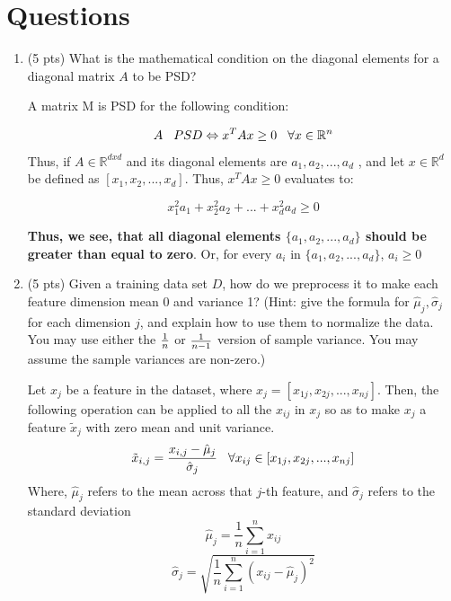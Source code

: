 \documentclass[a4paper]{article}
\theoremstyle{definition}
\newenvironment{soln}{
    \leavevmode\color{blue}\ignorespaces
}{}
\begin{document}
\section{Questions}
\begin{enumerate}

\item (5 pts) What is the mathematical condition on the diagonal elements for a diagonal matrix $A$ to be PSD?

\begin{soln}

A matrix M is PSD for the following condition:

$$
A \hspace{0.3cm} PSD \Leftrightarrow  x^TAx \geq 0 \hspace{0.3cm} \forall x \in \mathbb{R}^n
$$
Thus, if $A \in \mathbb{R}^{dxd}$ and its diagonal elements are ${a_1, a_2, ..., a_d}$ , and let $x \in \mathbb{R}^d$ be defined as $[x_1, x_2, ... , x_d]$. Thus, $x^TAx \geq 0$ evaluates to:

$$x_1^2a_1 + x_2^2a_2 + ... + x_d^2a_d \geq 0$$

\textbf{Thus, we see, that all diagonal elements $\{a_1, a_2, ..., a_d\}$ should be greater than equal to zero}. Or, for every $a_i$ in $\{a_1, a_2, ..., a_d\}$, $a_i \geq 0$
\end{soln}

\item (5 pts) Given a training data set $D$, how do we preprocess it to make each feature dimension mean 0 and variance 1? (Hint: give the formula for $\hat \mu_j, \hat \sigma_j$ for each dimension $j$, and explain how to use them to normalize the data.  You may use either the $1 \over n$ or $1 \over n-1$ version of sample variance.  You may assume the sample variances are non-zero.) 


\begin{soln}
	Let $x_j$ be a feature in the dataset, where $x_j = [x_{1j}, x_{2j}, ... , x_{nj}]$. Then, the following operation can be applied to all the $x_{ij}$ in $x_j$ so as to make $x_j$ a feature $\tilde x_j$ with zero mean and unit variance.
	$$
	\tilde{x}_{i,j} = \frac{x_{i,j} - \hat \mu_{j}}{\hat \sigma_j} \hspace{0.3cm} \forall x_{ij} \in [x_{1j}, x_{2j}, ... , x_{nj}]$$
	Where, $\hat \mu_{j}$ refers to the mean across that $j$-th feature, and $\hat \sigma_j$ refers to the standard deviation
	$$
	\hat \mu_{j} = \frac{1}{n}\sum_{i=1}^{n} x_{ij}
	$$
	$$
	\hat \sigma_j = \sqrt{\frac{1}{n} \sum_{i=1}^{n} (x_{ij} - \hat \mu_{j})^2}
	$$
\end{soln}


\end{enumerate}
\end{document}
